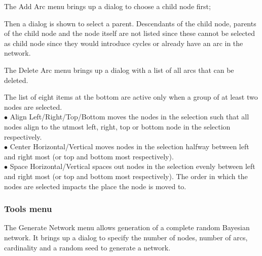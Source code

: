 \documentclass[a4paper]{article}
\begin{document}
\begin{center}
\end{center}

The Add Arc menu brings up a dialog to choose a child node first;

\begin{center}
\end{center}

Then a dialog is shown to select a parent. Descendants of the child
node, parents of the child node and the node itself are not listed since
these cannot be selected as child node since they would introduce cycles
or already have an arc in the network.

\begin{center}
\end{center}

The Delete Arc menu brings up a dialog with a list of all arcs that
can be deleted.

\begin{center}
\end{center}

The list of eight items at the bottom are active only when a group of at least
two nodes are selected.\\
$\bullet$ Align Left/Right/Top/Bottom moves the nodes in the selection such
that all nodes align to the utmost left, right, top or bottom node in the
selection respectively.\\
$\bullet$ Center Horizontal/Vertical moves nodes in the selection halfway
between left and right most (or top and bottom most respectively).\\
$\bullet$ Space Horizontal/Vertical spaces out nodes in the selection evenly
between left and right most (or top and bottom most respectively). The order
in which the nodes are selected impacts the place the node is moved to.\\

\subsubsection*{Tools menu}

\begin{center}
\end{center}


The Generate Network menu allows generation of a complete random Bayesian 
network. It brings up a dialog to specify the number of nodes, number of
arcs, cardinality and a random seed to generate a network.
\end{document}
